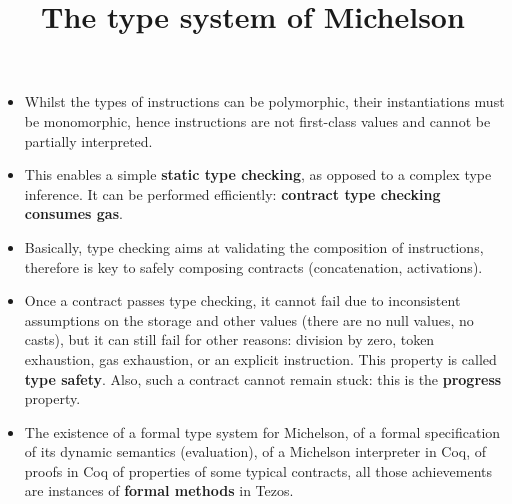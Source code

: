\documentclass[wide]{slides}
\begin{document}
\begin{slide}
  \title{The type system of Michelson}

  \begin{itemize}

    \item Whilst the types of instructions can be polymorphic, their
      instantiations must be monomorphic, hence instructions are not
      first-class values and cannot be partially interpreted.

    \item This enables a simple \textbf{static type checking}, as
      opposed to a complex type inference. It can be performed
      efficiently: \textbf{contract type checking consumes gas}.

    \item Basically, type checking aims at validating the composition
      of instructions, therefore is key to safely composing contracts
      (concatenation, activations).

    \item Once a contract passes type checking, it cannot fail due to
      inconsistent assumptions on the storage and other values (there
      are no null values, no casts), but it can still fail for other
      reasons: division by zero, token exhaustion, gas exhaustion, or
      an explicit  instruction. This property is called
      \textbf{type safety}. Also, such a contract cannot remain stuck:
      this is the \textbf{progress} property.

    \item The existence of a formal type system for Michelson, of a
      formal specification of its dynamic semantics (evaluation), of a
      Michelson interpreter in Coq, of proofs in Coq of properties of
      some typical contracts, all those achievements are instances of
      \textbf{formal methods} in Tezos.

  \end{itemize}

\end{slide}
\end{document}
